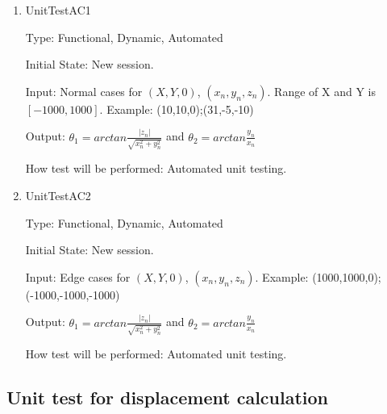 \documentclass[12pt, titlepage]{article}
\begin{document}
\begin{enumerate}
	
	\item{UnitTestAC1\\}
	
	Type: Functional, Dynamic, Automated
	
	Initial State: New session.
	
	Input: Normal cases for $(X,Y,0)$, $(x_{n},y_{n},z_{n})$. Range of X and Y is $[-1000,1000]$. Example: (10,10,0);(31,-5,-10)
	
	Output: $\theta_{1}=arctan \frac{|z_{n}|}{\sqrt{x_{n}^2+y_{n}^2}}$ and $\theta_{2}=arctan \frac{y_{n}}{x_{n}}$
	
	How test will be performed: Automated unit testing.
	
	\item{UnitTestAC2\\}
	
	Type: Functional, Dynamic, Automated
	
	Initial State: New session.
	
	Input: Edge cases for $(X,Y,0)$, $(x_{n},y_{n},z_{n})$. Example: (1000,1000,0);(-1000,-1000,-1000)
	
	Output: $\theta_{1}=arctan \frac{|z_{n}|}{\sqrt{x_{n}^2+y_{n}^2}}$ and $\theta_{2}=arctan \frac{y_{n}}{x_{n}}$
	
	How test will be performed: Automated unit testing.
	
\end{enumerate}

\subsection{Unit test for displacement calculation}
\end{document}
